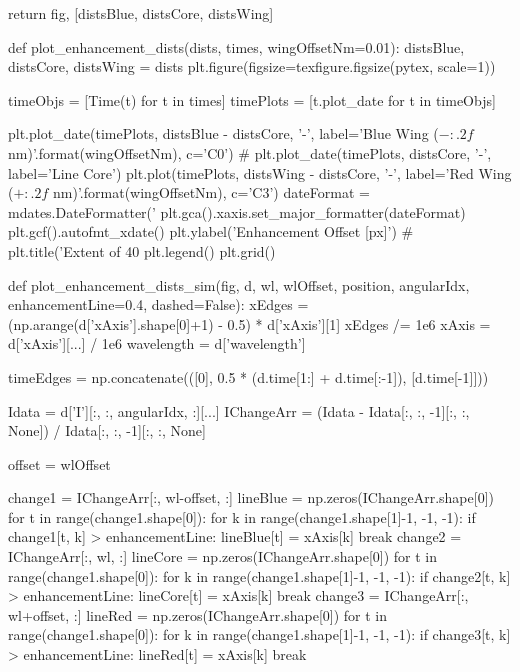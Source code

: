 \begin{pycode}[2DRT]
    return fig, [distsBlue, distsCore, distsWing]

def plot_enhancement_dists(dists, times, wingOffsetNm=0.01):
    distsBlue, distsCore, distsWing = dists
    plt.figure(figsize=texfigure.figsize(pytex, scale=1))

    timeObjs = [Time(t) for t in times]
    timePlots = [t.plot_date for t in timeObjs]

    plt.plot_date(timePlots, distsBlue - distsCore, '-', label='Blue Wing ($-{:.2f}$ nm)'.format(wingOffsetNm), c='C0')
    # plt.plot_date(timePlots, distsCore, '-', label='Line Core')
    plt.plot(timePlots, distsWing - distsCore, '-', label='Red Wing ($+{:.2f}$ nm)'.format(wingOffsetNm), c='C3')
    dateFormat = mdates.DateFormatter('%
    plt.gca().xaxis.set_major_formatter(dateFormat)
    plt.gcf().autofmt_xdate()
    plt.ylabel('Enhancement Offset [px]')
#     plt.title('Extent of 40%
    plt.legend()
    plt.grid()

def plot_enhancement_dists_sim(fig, d, wl, wlOffset, position,
                               angularIdx, enhancementLine=0.4, dashed=False):
    xEdges = (np.arange(d['xAxis'].shape[0]+1) - 0.5) * d['xAxis'][1]
    xEdges /= 1e6
    xAxis = d['xAxis'][...] / 1e6
    wavelength = d['wavelength']

    timeEdges = np.concatenate(([0],
                                0.5 * (d.time[1:] + d.time[:-1]),
                                [d.time[-1]]))

    Idata = d['I'][:, :, angularIdx, :][...]
    IChangeArr = (Idata - Idata[:, :, -1][:, :, None]) / Idata[:, :, -1][:, :, None]

    offset = wlOffset

    change1 = IChangeArr[:, wl-offset, :]
    lineBlue = np.zeros(IChangeArr.shape[0])
    for t in range(change1.shape[0]):
        for k in range(change1.shape[1]-1, -1, -1):
            if change1[t, k] > enhancementLine:
                lineBlue[t] = xAxis[k]
                break
    change2 = IChangeArr[:, wl, :]
    lineCore = np.zeros(IChangeArr.shape[0])
    for t in range(change1.shape[0]):
        for k in range(change1.shape[1]-1, -1, -1):
            if change2[t, k] > enhancementLine:
                lineCore[t] = xAxis[k]
                break
    change3 = IChangeArr[:, wl+offset, :]
    lineRed = np.zeros(IChangeArr.shape[0])
    for t in range(change1.shape[0]):
        for k in range(change1.shape[1]-1, -1, -1):
            if change3[t, k] > enhancementLine:
                lineRed[t] = xAxis[k]
                break


\end{pycode}
